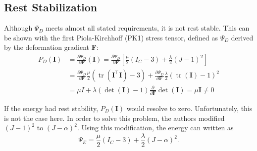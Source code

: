 
\subsection{Rest Stabilization}
Although $\Psi_{D}$ meets almost all stated requirements, it is not rest stable. This can be shown with the first Piola-Kirchhoff (PK1) stress tensor, defined as $\Psi_D$ derived by the deformation gradient \textbf{F}:
\begin{align*}
P_{D}(\mathbf{I}) &= \frac{\partial \Psi_{D}}{\partial \mathbf{F}} (\mathbf{I}) = \frac{\partial \Psi_{D}}{\partial \mathbf{F}} \left[ \frac{\mu}{2}\left(I_{C}-3\right) +\frac{\lambda}{2}(J-1)^{2} \right] \\
&= \frac{\partial \Psi_{D}}{\partial \mathbf{F}}  \frac{\mu}{2}\left(\operatorname{tr}(\mathbf{I}^\intercal \mathbf{I})-3\right) +\frac{\partial \Psi_{D}}{\partial \mathbf{F}} \frac{\lambda}{2}(\operatorname{tr}(\mathbf{I})-1)^{2} \\
&= \mu I + \lambda (\operatorname{det}(\mathbf{I})-1)  \frac{\partial}{\partial \mathbf{F}} \operatorname{det}(\mathbf{I}) = \mu \mathbf{I} \neq 0
\end{align*}

If the energy had rest stability, $P_{D}(\mathbf{I})$ would resolve to zero. Unfortunately, this is not the case here. In order to solve this problem, the authors modified $(J-1)^{2}$ to $(J-\alpha)^{2}$. Using this modification, the energy can written as
\[
\Psi_{E} = \frac{\mu}{2}\left(I_{C}-3\right) +\frac{\lambda}{2}(J-\alpha)^{2}.
\]

